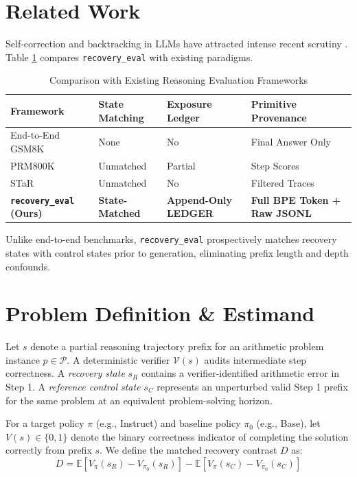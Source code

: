 \documentclass[10pt,conference]{IEEEtran}
\begin{document}
\section{Related Work}
Self-correction and backtracking in LLMs have attracted intense recent scrutiny \cite{snell2024scaling, wang2022selfconsistency, huang2023large}. Table \ref{tab:literature} compares \texttt{recovery\_eval} with existing paradigms.

\begin{table}[htbp]
\caption{Comparison with Existing Reasoning Evaluation Frameworks}
\label{tab:literature}
\centering
\begin{tabular}{p{2.2cm}p{1.4cm}p{1.6cm}p{1.8cm}}
\toprule
\textbf{Framework} & \textbf{State Matching} & \textbf{Exposure Ledger} & \textbf{Primitive Provenance} \\
\midrule
End-to-End GSM8K \cite{cobbe2021gsm8k} & None & No & Final Answer Only \\
PRM800K \cite{lightman2023process} & Unmatched & Partial & Step Scores \\
STaR \cite{zelikman2022star} & Unmatched & No & Filtered Traces \\
\textbf{\texttt{recovery\_eval} (Ours)} & \textbf{State-Matched} & \textbf{Append-Only LEDGER} & \textbf{Full BPE Token + Raw JSONL} \\
\bottomrule
\end{tabular}
\end{table}

Unlike end-to-end benchmarks, \texttt{recovery\_eval} prospectively matches recovery states with control states prior to generation, eliminating prefix length and depth confounds.

\section{Problem Definition \& Estimand}
Let $s$ denote a partial reasoning trajectory prefix for an arithmetic problem instance $p \in \mathcal{P}$. A deterministic verifier $\mathcal{V}(s)$ audits intermediate step correctness. A \textit{recovery state} $s_R$ contains a verifier-identified arithmetic error in Step 1. A \textit{reference control state} $s_C$ represents an unperturbed valid Step 1 prefix for the same problem at an equivalent problem-solving horizon.

For a target policy $\pi$ (e.g., Instruct) and baseline policy $\pi_0$ (e.g., Base), let $V(s) \in \{0, 1\}$ denote the binary correctness indicator of completing the solution correctly from prefix $s$. We define the matched recovery contrast $D$ as:
\begin{equation}
D = \mathbb{E}[V_{\pi}(s_R) - V_{\pi_0}(s_R)] - \mathbb{E}[V_{\pi}(s_C) - V_{\pi_0}(s_C)]
\end{equation}
\end{document}
